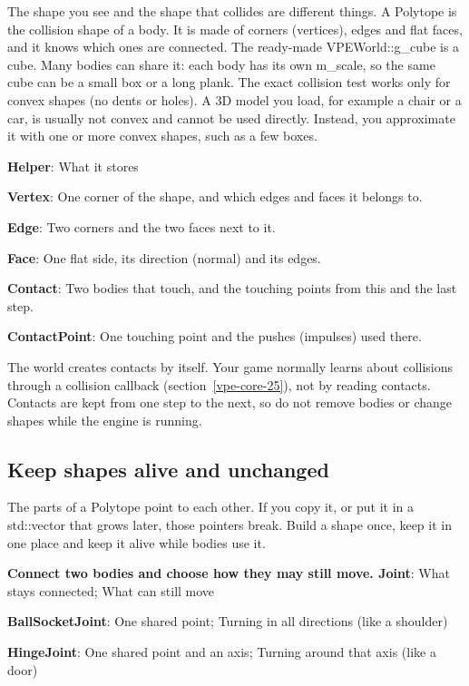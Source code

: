 \documentclass[11pt,a4paper]{article}
\begin{document}
\label{vpe-core-6}
The shape you see and the shape that collides are different things. A Polytope is the collision shape of a body. It is made of corners (vertices), edges and flat faces, and it knows which ones are connected. The ready-made VPEWorld::g\_cube is a cube. Many bodies can share it: each body has its own m\_scale, so the same cube can be a small box or a long plank. The exact collision test works only for convex shapes (no dents or holes). A 3D model you load, for example a chair or a car, is usually not convex and cannot be used directly. Instead, you approximate it with one or more convex shapes, such as a few boxes.

\textbf{Helper}: What it stores

\textbf{Vertex}: One corner of the shape, and which edges and faces it belongs to.

\textbf{Edge}: Two corners and the two faces next to it.

\textbf{Face}: One flat side, its direction (normal) and its edges.

\textbf{Contact}: Two bodies that touch, and the touching points from this and the last step.

\textbf{ContactPoint}: One touching point and the pushes (impulses) used there.

The world creates contacts by itself. Your game normally learns about collisions through a collision callback (section~\ref{vpe-core-25}), not by reading contacts. Contacts are kept from one step to the next, so do not remove bodies or change shapes while the engine is running.

\subsection*{Keep shapes alive and unchanged}
The parts of a Polytope point to each other. If you copy it, or put it in a std::vector that grows later, those pointers break. Build a shape once, keep it in one place and keep it alive while bodies use it.

\label{vpe-core-7}
\textbf{Connect two bodies and choose how they may still move. Joint}: What stays connected; What can still move

\textbf{BallSocketJoint}: One shared point; Turning in all directions (like a shoulder)

\textbf{HingeJoint}: One shared point and an axis; Turning around that axis (like a door)
\end{document}
